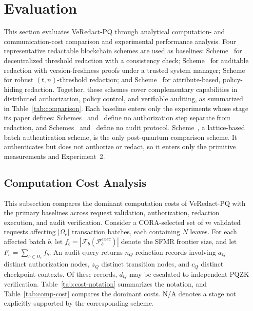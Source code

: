 \documentclass[lettersize,journal]{IEEEtran}
\begin{document}
    \section{Evaluation}
    \label{sec:evaluation}
    
    This section evaluates VeRedact-PQ through analytical computation- and
    communication-cost comparison and experimental performance analysis.
    Four representative redactable blockchain schemes are used as
    baselines: Scheme~\cite{ref1} for decentralized threshold
    redaction with a consistency check; Scheme~\cite{ref13} for auditable redaction
    with version-freshness proofs under a trusted system manager;
    Scheme~\cite{ref27} for robust $(t,n)$-threshold redaction;
    and Scheme~\cite{ref34} for attribute-based,
    policy-hiding redaction. Together, these schemes cover complementary
    capabilities in distributed authorization, policy control, and
    verifiable auditing, as summarized in Table~\ref{tab:comparison}. Each
    baseline enters only the experiments whose stage its paper defines:
    Schemes~\cite{ref13} and~\cite{ref27} define no authorization step
    separate from redaction, and Schemes~\cite{ref27} and~\cite{ref34}
    define no audit protocol.
    \textcolor{e2}{Scheme~\cite{ref39}, a lattice-based batch
    authentication scheme, is the only post-quantum comparison scheme. It
    authenticates but does not authorize or redact, so it enters only the
    primitive measurements and Experiment~2.}

\subsection{Computation Cost Analysis}
\label{subsec:computation-cost}

This subsection compares the dominant computation costs of VeRedact-PQ
with the primary baselines across request validation, authorization,
redaction execution, and audit verification. Consider a CORA-selected
set of $m$ validated requests affecting $|\Omega_e|$ transaction
batches, each containing $N$ leaves. For each affected batch $b$, let
$f_b=|\mathcal{F}_b(\mathcal{P}_b^{exec})|$ denote the SFMR frontier
size, and let $F_e=\sum_{b\in\Omega_e}f_b$. An audit query returns
$n_Q$ redaction records involving $a_Q$ distinct authorization nodes,
$z_Q$ distinct transition nodes, and $c_Q$ distinct checkpoint
contexts. Of these records, $d_Q$ may be escalated to independent PQZK
verification. Table~\ref{tab:cost-notation} summarizes the notation,
and Table~\ref{tab:comp-cost} compares the dominant costs. N/A denotes
a stage not explicitly supported by the corresponding scheme.
\end{document}
